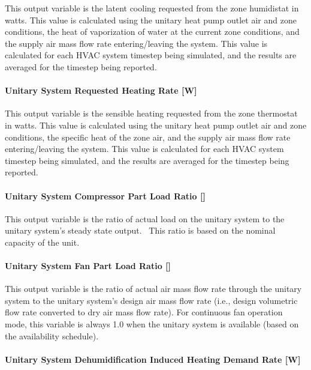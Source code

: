 This output variable is the latent cooling requested from the zone humidistat in watts. This value is calculated using the unitary heat pump outlet air and zone conditions, the heat of vaporization of water at the current zone conditions, and the supply air mass flow rate entering/leaving the system. This value is calculated for each HVAC system timestep being simulated, and the results are averaged for the timestep being reported.

\paragraph{Unitary System Requested Heating Rate {[}W{]}}\label{unitary-system-requested-heating-rate-w-1}

This output variable is the sensible heating requested from the zone thermostat in watts. This value is calculated using the unitary heat pump outlet air and zone conditions, the specific heat of the zone air, and the supply air mass flow rate entering/leaving the system. This value is calculated for each HVAC system timestep being simulated, and the results are averaged for the timestep being reported.

\paragraph{Unitary System Compressor Part Load Ratio {[]}}\label{unitary-system-compressor-part-load-ratio-4}

This output variable is the ratio of actual load on the unitary system to the unitary system's steady state output.~ This ratio is based on the nominal capacity of the unit.

\paragraph{Unitary System Fan Part Load Ratio {[]}}\label{unitary-system-fan-part-load-ratio-7}

This output variable is the ratio of actual air mass flow rate through the unitary system to the unitary system's design air mass flow rate (i.e., design volumetric flow rate converted to dry air mass flow rate). For continuous fan operation mode, this variable is always 1.0 when the unitary system is available (based on the availability schedule).

\paragraph{Unitary System Dehumidification Induced Heating Demand Rate {[}W{]}}\label{unitary-system-dehumidification-induced-heating-demand-rate-w-1}

